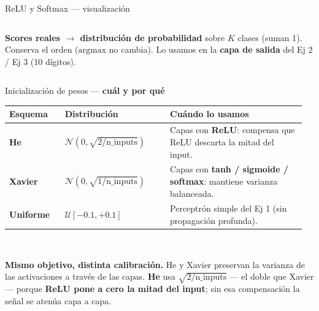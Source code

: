 \documentclass[11pt,aspectratio=169]{beamer}
\begin{document}
\begin{frame}{ReLU y Softmax — visualización}
\begin{columns}[T]
\begin{insight}\small
\textbf{Scores reales $\to$ distribución de probabilidad} sobre $K$ clases (suman 1). Conserva el orden ($\mathrm{argmax}$ no cambia). Lo usamos en la \textbf{capa de salida} del Ej 2 / Ej 3 (10 dígitos).
\end{insight}

\end{columns}
\end{frame}

\begin{frame}{Inicialización de pesos — \textbf{cuál y por qué}}
\centering\small
\begin{tabular}{@{}p{0.18\linewidth}p{0.34\linewidth}p{0.44\linewidth}@{}}
\toprule
\textbf{Esquema} & \textbf{Distribución} & \textbf{Cuándo lo usamos} \\
\midrule
\textbf{He}      & $\mathcal{N}\!\left(0, \sqrt{2/\text{n\_inputs}}\right)$ & Capas con \textbf{ReLU}: compensa que ReLU descarta la mitad del input. \\
\textbf{Xavier}  & $\mathcal{N}\!\left(0, \sqrt{1/\text{n\_inputs}}\right)$ & Capas con \textbf{tanh / sigmoide / softmax}: mantiene varianza balanceada. \\
\textbf{Uniforme} & $\mathcal{U}[-0.1, +0.1]$                            & Perceptrón simple del Ej 1 (sin propagación profunda). \\
\bottomrule
\end{tabular}\\[0.8em]

\begin{insight}\small
\textbf{Mismo objetivo, distinta calibración.} He y Xavier preservan la varianza de las activaciones a través de las capas. \textbf{He} usa $\sqrt{2/\text{n\_inputs}}$ — el doble que Xavier — porque \textbf{ReLU pone a cero la mitad del input}; sin esa compensación la señal se atenúa capa a capa.
\end{insight}
\end{frame}
\end{document}

